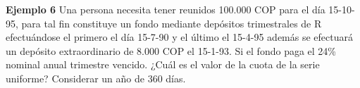 \textbf{Ejemplo 6}\newline
Una persona necesita tener reunidos 100.000 COP para el día 15-10-95, para tal fin constituye un fondo mediante depósitos trimestrales de R efectuándose el primero el día 15-7-90 y el último el 15-4-95 además se efectuará un depósito extraordinario de 8.000 COP el 15-1-93. Si el fondo paga el 24\% nominal anual trimestre vencido. ¿Cuál es el valor de la cuota de la serie uniforme? Considerar un año de 360 días.\\ \\

